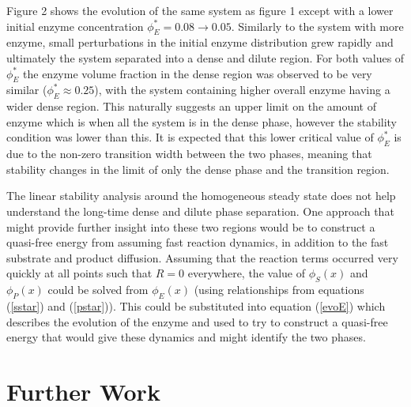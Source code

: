 Figure 2 shows the evolution of the same system as figure 1 except with a lower initial enzyme concentration $\phi_E^*=0.08 \rightarrow 0.05$. Similarly to the system with more enzyme, small perturbations in the initial enzyme distribution grew rapidly and ultimately the system separated into a dense and dilute region. For both values of $\phi_E^*$ the enzyme volume fraction in the dense region was observed to be very similar ($\phi_E^*\approx0.25$), with the system containing higher overall enzyme having a wider dense region. This naturally suggests an upper limit on the amount of enzyme which is when all the system is in the dense phase, however the stability condition was lower than this. It is expected that this lower critical value of $\phi_E^*$ is due to the non-zero transition width between the two phases, meaning that stability changes in the limit of only the dense phase and the transition region.

\begin{figure}[t]
  \makebox[\textwidth][c]{}
  \label{fig:low_enz}
\end{figure}

The linear stability analysis around the homogeneous steady state does not help understand the long-time dense and dilute phase separation. One approach that might provide further insight into these two regions would be to construct a quasi-free energy from assuming fast reaction dynamics, in addition to the fast substrate and product diffusion. Assuming that the reaction terms occurred very quickly at all points such that $R=0$ everywhere, the value of $\phi_S(x)$ and $\phi_P(x)$ could be solved from $\phi_E(x)$ (using relationships from equations (\ref{sstar}) and (\ref{pstar})). This could be substituted into equation (\ref{evoE}) which describes the evolution of the enzyme and used to try to construct a quasi-free energy that would give these dynamics and might identify the two phases.

\section{Further Work}


